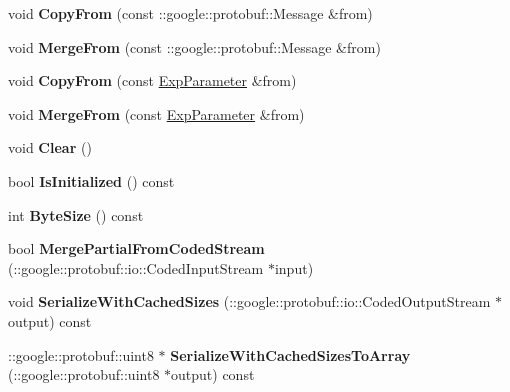 \begin{DoxyCompactItemize}
void {\bfseries Copy\+From} (const \+::google\+::protobuf\+::\+Message \&from)
\item 
\mbox{\label{classcaffe_1_1_exp_parameter_abcf28d4f09a72f79611e62bcff88b599}} 
void {\bfseries Merge\+From} (const \+::google\+::protobuf\+::\+Message \&from)
\item 
\mbox{\label{classcaffe_1_1_exp_parameter_a8512381c6810db486e9cf4e6fd62234b}} 
void {\bfseries Copy\+From} (const \mbox{\hyperlink{classcaffe_1_1_exp_parameter}{Exp\+Parameter}} \&from)
\item 
\mbox{\label{classcaffe_1_1_exp_parameter_a30813661b5e0daa0ea4b8d7711407dcb}} 
void {\bfseries Merge\+From} (const \mbox{\hyperlink{classcaffe_1_1_exp_parameter}{Exp\+Parameter}} \&from)
\item 
\mbox{\label{classcaffe_1_1_exp_parameter_ac01c491b45f99b795867009b2f055e54}} 
void {\bfseries Clear} ()
\item 
\mbox{\label{classcaffe_1_1_exp_parameter_a6994d792a79092de32bde865973e218c}} 
bool {\bfseries Is\+Initialized} () const
\item 
\mbox{\label{classcaffe_1_1_exp_parameter_a25bfb4a81375ab6fd474249cf7470332}} 
int {\bfseries Byte\+Size} () const
\item 
\mbox{\label{classcaffe_1_1_exp_parameter_ab9ba9dff15300979236b19a3dfbed1be}} 
bool {\bfseries Merge\+Partial\+From\+Coded\+Stream} (\+::google\+::protobuf\+::io\+::\+Coded\+Input\+Stream $\ast$input)
\item 
\mbox{\label{classcaffe_1_1_exp_parameter_a55a8087fb0c26905179e82dfdfcc0026}} 
void {\bfseries Serialize\+With\+Cached\+Sizes} (\+::google\+::protobuf\+::io\+::\+Coded\+Output\+Stream $\ast$output) const
\item 
\mbox{\label{classcaffe_1_1_exp_parameter_a97cee1258305ed56ff5db0190c2b8fb2}} 
\+::google\+::protobuf\+::uint8 $\ast$ {\bfseries Serialize\+With\+Cached\+Sizes\+To\+Array} (\+::google\+::protobuf\+::uint8 $\ast$output) const

\end{DoxyCompactItemize}
